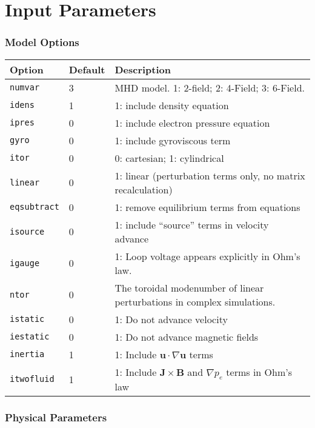 \documentclass[letterpaper]{book}
\renewcommand{\vec}[1]{\ensuremath{\mathbf{#1}}}
\newcommand{\B}{\vec{B}}
\renewcommand{\u}{\vec{u}}
\renewcommand{\j}{\vec{J}}
\newcommand{\grad}[1]{\nabla #1}
\begin{document}
\chapter{Input Parameters}
\label{sec:input_parameters}

\subsection{Model Options}

\begin{tabular}{llp{3in}}
  \textbf{Option}&\textbf{Default}&\textbf{Description}\\
  \hline
  \texttt{numvar} & 3   & MHD model. 1: 2-field;  2: 4-Field;  3: 6-Field.\\
  \texttt{idens}  & 1   & 1: include density equation\\
  \texttt{ipres}  & 0   & 1: include electron pressure equation\\
  \texttt{gyro}   & 0   & 1: include gyroviscous term\\
  \texttt{itor}   & 0   & 0: cartesian; 1: cylindrical\\
  \texttt{linear} & 0   & 1: linear (perturbation terms only, no matrix
                              recalculation)\\
  \texttt{eqsubtract}& 0& 1: remove equilibrium terms from equations\\
  \texttt{isource}   & 0& 1: include ``source'' terms in velocity
    advance\\
  \texttt{igauge} & 0   & 1: Loop voltage appears explicitly in Ohm's law.\\
  \texttt{ntor}   & 0   & The toroidal modenumber of linear perturbations in
                          complex simulations.\\
  \texttt{istatic}& 0   & 1: Do not advance velocity\\
  \texttt{iestatic}&0   & 1: Do not advance magnetic fields\\
  \texttt{inertia} & 1  & 1: Include $\u \cdot \grad{\u}$ terms\\
  \texttt{itwofluid}& 1 & 1: Include $\j\times\B$ and
  $\grad{p_e}$ terms in Ohm's law\\ 
\end{tabular}


\subsection{Physical Parameters}
\end{document}
